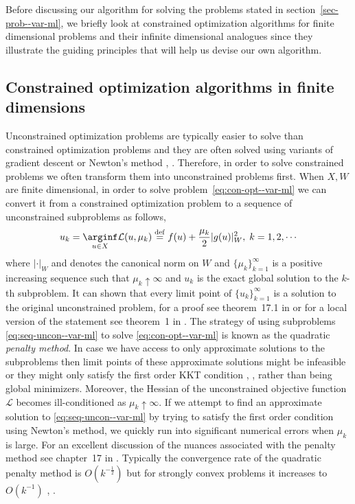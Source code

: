 Before discussing our algorithm for solving the problems stated in section~\ref{sec-prob--var-ml}, we briefly look at constrained optimization algorithms for finite dimensional problems and their infinite dimensional analogues since they illustrate the guiding principles that will help us devise our own algorithm. 


\subsection{Constrained optimization algorithms in finite dimensions}
Unconstrained optimization problems are typically easier to solve than constrained optimization problems and they are often solved using variants of gradient descent or Newton's method \cite{bonnans2006numerical}, \cite{jorge2006numerical}. Therefore, in order to solve constrained problems we often transform them into unconstrained problems first. When $X, W$ are finite dimensional, in order to solve problem~\eqref{eq:con-opt--var-ml} we can convert it from a constrained optimization problem to a sequence of unconstrained subproblems as follows,
\begin{align}
    u_k=\underset{u\in X}\arginf \mathcal L(u, \mu_k)\stackrel{\rm def}{=}f(u) + \frac{\mu_k}{2}|g(u)|_W^2,\;k=1,2,\cdots\label{eq:seq-uncon--var-ml}
\end{align}
where $|\cdot|_W$ and  denotes the canonical norm on $W$ and $\{\mu_k\}_{k=1}^\infty$ is a positive increasing sequence such that $\mu_k\uparrow\infty$ and $u_k$ is the exact global solution to the $k$-th subproblem. It can shown that every limit point of $\{u_k\}_{k=1}^\infty$ is a solution to the original unconstrained problem, for a proof see theorem~17.1 in \cite{jorge2006numerical} or for a local version of the statement see theorem~1 in \cite{polyak1971convergence}. The strategy of using subproblems \eqref{eq:seq-uncon--var-ml} to solve \eqref{eq:con-opt--var-ml} is known as the quadratic \textit{penalty method}. In case we have access to only approximate solutions to the subproblems then limit points of these approximate solutions might be infeasible or they might only satisfy the first order KKT condition  \cite{kuhn2013nonlinear}, \cite{gordon2012karush}, \cite{boltyanski1998geometric} rather than being global minimizers. Moreover, the Hessian of the unconstrained objective function $\mathcal L$ becomes ill-conditioned as $\mu_k\uparrow\infty$. If we attempt to find an approximate solution to \eqref{eq:seq-uncon--var-ml} by trying to satisfy the first order condition using Newton's method, we quickly run into significant numerical errors when $\mu_k$ is large. For an excellent discussion of the nuances associated with the penalty method see chapter~17 in \cite{jorge2006numerical}. Typically the convergence rate of the quadratic penalty method is $O(k^{-\frac{1}{2}})$ but for strongly convex problems it increases to $O(k^{-1}) $  \cite{li2017convergence}, \cite{polyak1971convergence}.


